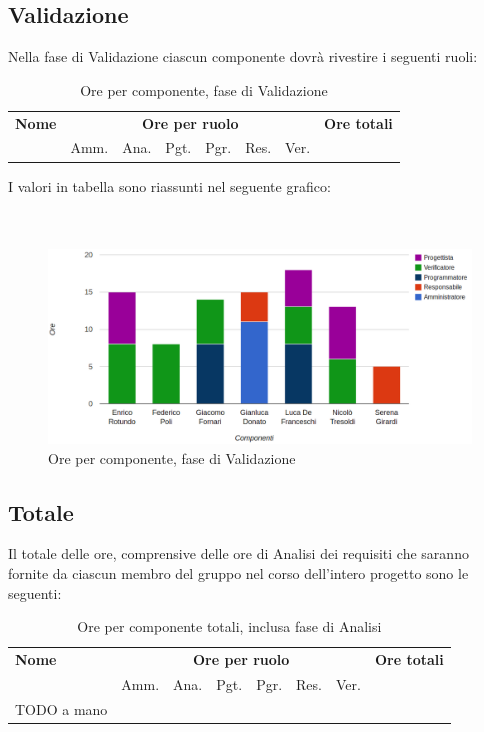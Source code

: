 \pagebreak
\subsection{Validazione}

Nella fase di Validazione ciascun componente dovrà rivestire i seguenti ruoli:

\begin{table}[H]
\centering
\begin{tabular}{lccccccc}
\toprule 
    \textbf{Nome}  & \multicolumn{6}{c}{\textbf{Ore per ruolo}} & \textbf{Ore totali}\\
    & Amm. & Ana. & Pgt. & Pgr. & Res. & Ver. \\
    \midrule

        

    \bottomrule
\end{tabular}
\caption{Ore per componente, fase di Validazione}
\end{table}

I valori in tabella sono riassunti nel seguente grafico: \\ \\ \\

\begin{figure}[H]
\centering
\includegraphics[scale=0.35]{4-4.png}
\caption{Ore per componente, fase di Validazione\label{fig:nome}}
\end{figure}

\pagebreak
\subsection{Totale}

Il totale delle ore, comprensive delle ore di Analisi dei requisiti che saranno fornite da ciascun membro del gruppo nel corso dell'intero progetto sono le seguenti:

\begin{table}[H]
\centering
\begin{tabular}{lccccccc}
\toprule 
    \textbf{Nome}  & \multicolumn{6}{c}{\textbf{Ore per ruolo}} & \textbf{Ore totali}\\
     & Amm. & Ana. & Pgt. & Pgr. & Res. & Ver. \\
    \midrule

		TODO a mano \\

    \bottomrule
\end{tabular}
\caption{Ore per componente totali, inclusa fase di Analisi}
\end{table}


